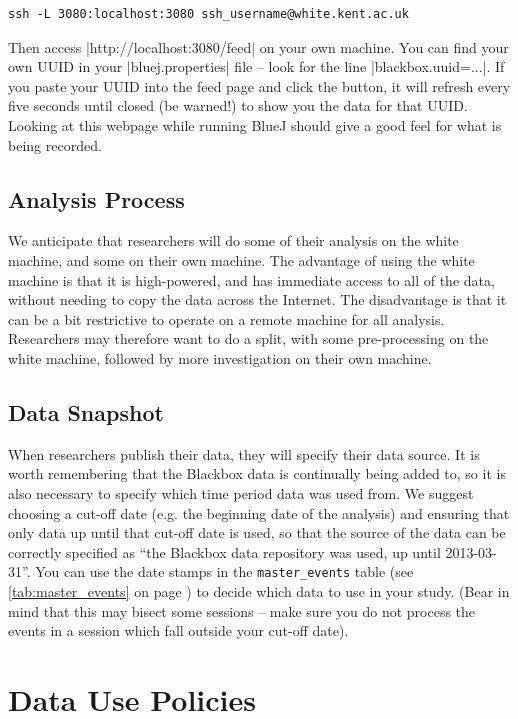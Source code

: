 \documentclass{report}
\newcommand{\myref}[1]{\autoref{#1} on page \pageref*{#1}}
\newcommand{\tabref}[1]{\lstinline|#1| table (see \myref{tab:#1})}
\begin{document}
\begin{lstlisting}
ssh -L 3080:localhost:3080 ssh_username@white.kent.ac.uk
\end{lstlisting}

Then access |http://localhost:3080/feed| on your own machine.  You can find
your own UUID in your |bluej.properties| file -- look for the line
|blackbox.uuid=...|.  If you paste your UUID into the feed page and click the
button, it will refresh every five seconds until closed (be warned!) to show
you the data for that UUID.  Looking at this webpage while running BlueJ
should give a good feel for what is being recorded.

\section{Analysis Process}

We anticipate that researchers will do some of their analysis on the white
machine, and some on their own machine.  The advantage of using the white
machine is that it is high-powered, and has immediate access to all of the
data, without needing to copy the data across the Internet.  The disadvantage
is that it can be a bit restrictive to operate on a remote machine for all
analysis.  Researchers may therefore want to do a split, with some
pre-processing on the white machine, followed by more investigation on their
own machine.

\section{Data Snapshot}

When researchers publish their data, they will specify their data source.  It
is worth remembering that the Blackbox data is continually being added to, so
it is also necessary to specify which time period data was used from.  We
suggest choosing a cut-off date (e.g. the beginning date of the analysis) and
ensuring that only data up until that cut-off date is used, so that the source
of the data can be correctly specified as ``the Blackbox data repository was
used, up until 2013-03-31''.  You can use the date stamps in the
\tabref{master_events} to decide which data to use in your study.  (Bear in
mind that this may bisect some sessions -- make sure you do not process the
events in a session which fall outside your cut-off date).

\chapter{Data Use Policies}
\end{document}
